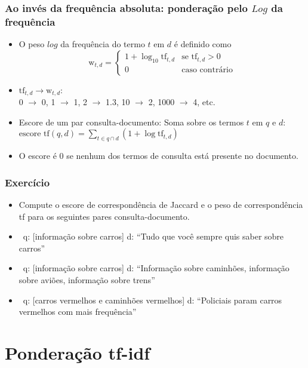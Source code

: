 \documentclass[compress]{beamer}
\def\mygreen#1{\textcolor{texgreen}{#1}}
\begin{document}
\begin{frame}[<+->]
\frametitle{Ao invés da frequência absoluta: ponderação pelo $Log$ da frequência}
\pause[2]
\begin{itemize}
\item O peso $log$ da frequência do termo $t$ em $d$ é definido como
\begin{equation}\label{eqn:logweight}
    \mbox{w}_{t,d}=\left\{
    \begin{array}{ll}
      1+\log_{10} \mbox{tf}_{t,d} & \mbox{se } \mbox{tf}_{t,d}>0 \\
      0 & \mbox{caso contrário} 
    \end{array}
   \right. \nonumber
\end{equation}
\item $\mbox{tf}_{t,d} \rightarrow \mbox{w}_{t,d}$:\\
0 $\rightarrow$ 0, 1 $\rightarrow$ 1, 
2 $\rightarrow$  1.3,
10 $\rightarrow$  2,
1000 $\rightarrow$  4, etc.
\item Escore  de um par consulta-documento: Soma sobre os termos $t$
  em $q$ e $d$:\\
$\mbox{escore tf}(q,d) = \sum_{t \in q \cap d} (1 + \log \mbox{tf}_{t,d})$
\item O escore é 0 se nenhum dos termos de consulta está presente no documento.
\end{itemize}
\end{frame}

\begin{frame}
\frametitle{Exercício}
\begin{itemize}
\item \mygreen{Compute o escore de correspondência de Jaccard e o peso de correspondência tf para os seguintes pares consulta-documento.}
\item \ q: [informação sobre carros] d: ``Tudo que você sempre quis saber sobre carros''
\item \ q: [informação sobre carros] d: ``Informação sobre caminhões,
  informação sobre aviões, informação sobre trens''
\item \ q: [carros vermelhos e caminhões vermelhos] d: ``Policiais param carros vermelhos com mais frequência''
\end{itemize}
\end{frame}

\section{Ponderação tf-idf}
\end{document}
